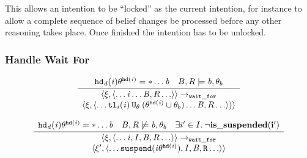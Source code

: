 This allows an intention to be ``locked'' as the
current intention, for instance to allow a complete sequence of belief
changes be processed before any other reasoning takes place.
Once 
finished the intention has to be unlocked. 

\subsubsection*{Handle Wait For}

\begin{equation}
\frac{\begin{array}{c}
\mathit{{\tt hd}_d}(\mathit{i})\theta^{{\tt hd}(\mathit{i})} = *\ldots{\ensuremath{\mathit{b}}}
\quad B, R \models \mathit{b}, \theta_b
\end{array}
}{
\begin{array}{c}
  \langle \xi, \langle \ldots \mathit{i} \ldots \mathit{B}, R \ldots \rangle \rangle
\rightarrow_{\tt wait\_for} \\
\langle \xi, \langle \ldots
{\tt tl}_i(\mathit{i}) \: {\tt U}_{\theta} \: (\theta^{{\tt hd}(\mathit{i})} \cup \theta_b)
\ldots \mathit{B}, R \ldots \rangle ) \rangle
\end{array}
}
\end{equation}

\begin{equation}
\frac{
\begin{array}{c}
  \mathit{{\tt hd}_d}(\mathit{i})\theta^{{\tt hd}(\mathit{i})} = *\ldots{\ensuremath{\mathit{b}}}
\quad B, R \not \models \mathit{b}, \theta_b
\quad \exists i' \in I. \: \neg \bf is\_suspended(i')
\end{array}
}{
\begin{array}{c}
  \langle \xi, \langle \ldots \mathit{i}, \mathit{I}, \mathit{B}, R \ldots \rangle \rangle
\rightarrow_{\tt wait\_for} \\
\langle \xi', \langle \ldots
\tt suspend(\mathit{i}\theta^{{\tt hd}(\mathit{i})}),
\mathit{I}, \mathit{B}, R \ldots
\rangle  \rangle
\end{array}
}
\end{equation}

